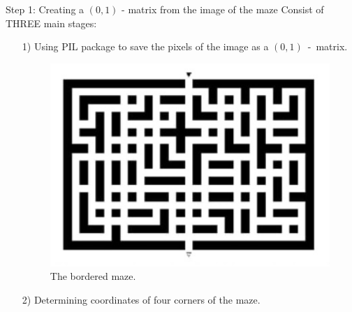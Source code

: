 \documentclass[10pt]{beamer}
\begin{document}
\begin{frame}{Step 1: Creating a $(0, 1)$ - matrix from the image of the maze}
Consist of THREE main stages:
\begin{itemize}
    \item [1)] Using PIL package to save the pixels of the image as a $(0, 1)$~-~matrix.
    \begin{figure}[htb!]
        \centering
        \includegraphics[scale=0.6]{../images/input_image2.jpg}
        \caption[]{The bordered maze.}
        \label{fig:} %
    \end{figure}
    \item [2)] Determining coordinates of four corners of the maze.
\end{itemize}
\end{frame}
\end{document}

